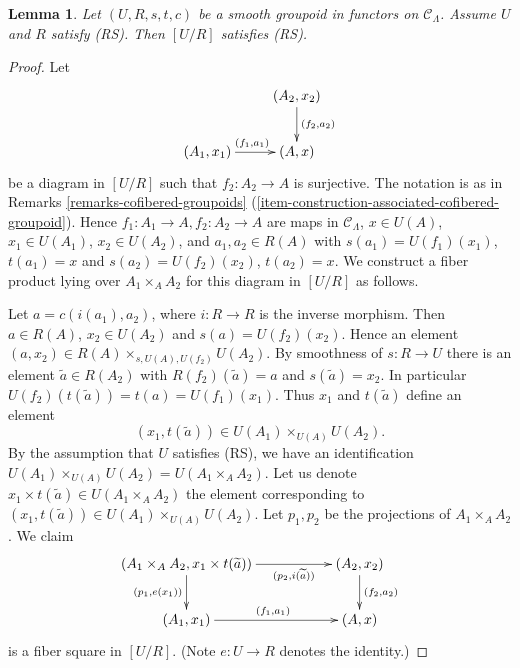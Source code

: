 \documentclass{stacks-project}
\theoremstyle{plain}
\newtheorem{lemma}[subsection]{Lemma}
\theoremstyle{definition}
\theoremstyle{remark}
\numberwithin{equation}{subsection}
\begin{document}
\begin{lemma}
\label{lemma-smooth-RS-groupoid-in-functors-quotient}
Let $(U, R, s, t, c)$ be a smooth groupoid in functors on $\mathcal{C}_\Lambda$.
Assume $U$ and $R$ satisfy (RS). Then $[U/R]$ satisfies (RS).
\end{lemma}

\begin{proof}
Let
$$
\xymatrix{
                           &     (A_2, x_2) \ar[d]^{(f_2, a_2)} \\
(A_1, x_1) \ar[r]^{(f_1, a_1)} &     (A, x)
}
$$
be a diagram in $[U/R]$ such that $f_2: A_2 \to A$ is surjective. The
notation is as in
Remarks \ref{remarks-cofibered-groupoids}
(\ref{item-construction-associated-cofibered-groupoid}).
Hence $f_1: A_1 \to A, f_2: A_2 \to A$ are maps in
$\mathcal{C}_\Lambda$, $x \in U(A)$, $x_1 \in U(A_1)$, $x_2 \in U(A_2)$,
and $a_1, a_2 \in R(A)$ with $s(a_1) = U(f_1)(x_1)$,
$t(a_1) = x$ and $s(a_2) = U(f_2)(x_2)$, $t(a_2) = x$.
We construct a fiber product lying over $A_1 \times_A A_2$
for this diagram in $[U/R]$ as follows.

\medskip\noindent
Let $a = c(i(a_1), a_2)$, where $i: R \to R$ is the inverse morphism.
Then $a \in R(A)$, $x_2 \in U(A_2)$ and $s(a) = U(f_2)(x_2)$.
Hence an element $(a, x_2) \in R(A) \times_{s, U(A), U(f_2)} U(A_2)$.
By smoothness of $s : R \to U$ there is an element
$\widetilde{a} \in R(A_2)$ with $R(f_2)(\widetilde{a}) = a$ and
$s(\widetilde{a}) = x_2$. In particular
$U(f_2)(t(\widetilde{a})) = t(a) = U(f_1)(x_1)$. Thus $x_1$ and
$t(\widetilde{a})$ define an element
$$
(x_1, t(\widetilde{a})) \in U(A_1) \times_{U(A)} U(A_2).
$$
By the assumption that $U$ satisfies (RS), we have an identification
$U(A_1) \times_{U(A)} U(A_2) = U(A_1 \times_A A_2)$. Let us denote
$x_1 \times t(\widetilde{a}) \in U(A_1 \times_A A_2)$ the element
corresponding to $(x_1, t(\widetilde{a})) \in U(A_1) \times_{U(A)} U(A_2)$.
Let $p_1, p_2$ be the projections of $A_1 \times_A A_2$.  We claim
$$
\xymatrix{
(A_1 \times_A A_2, x_1 \times t(\widetilde{a})) \ar[d]_{(p_1, e(x_1))}
\ar[rr]_-{(p_2, i(\widetilde{a}))} & & (A_2, x_2) \ar[d]^{(f_2, a_2)} \\
(A_1, x_1) \ar[rr]^{(f_1, a_1)} & & (A, x)
}
$$
is a fiber square in $[U/R]$. (Note $e: U \to R$ denotes the identity.)


\end{proof}
\end{document}
